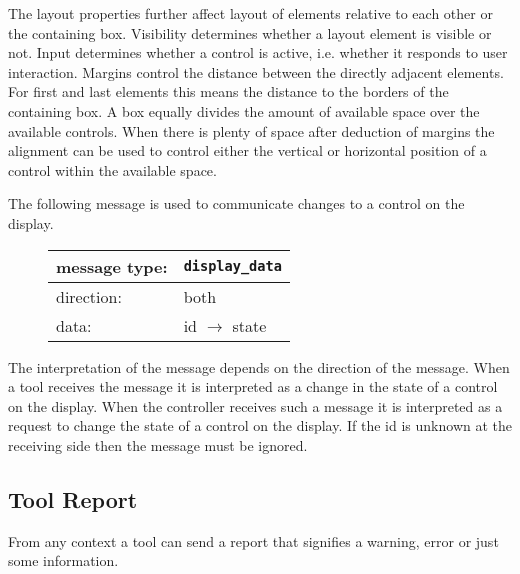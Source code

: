 \documentclass{article}
\newcommand{\msg}[1]{\texttt{#1}}
\begin{document}
   The layout properties further affect layout of elements relative to each
   other or the containing box. Visibility determines whether a layout element
   is visible or not. Input determines whether a control is active, i.e.
   whether it responds to user interaction. Margins control the distance
   between the directly adjacent elements. For first and last elements this
   means the distance to the borders of the containing box. A box equally
   divides the amount of available space over the available controls. When
   there is plenty of space after deduction of margins the alignment can be
   used to control either the vertical or horizontal position of a control
   within the available space.

   The following message is used to communicate changes to a control on the
   display.

   \begin{figure}[H]
    \begin{center}
     \begin{tabular}{|ll|}
      \hline
       message type:   & \msg{display\_data} \\
      \hline
       direction:      & both \\
       data:           & id $\rightarrow$ state \\
      \hline
     \end{tabular}
    \end{center}
   \end{figure}
   \vspace{-0.4cm}
   \noindent The interpretation of the message depends on the direction of the
   message. When a tool receives the message it is interpreted as a change in
   the state of a control on the display. When the controller receives such a
   message it is interpreted as a request to change the state of a control on
   the display. If the id is unknown at the receiving side then the message
   must be ignored.

  \subsection{Tool Report}

   From any context a tool can send a report that signifies a warning, error or
   just some information.
\end{document}
